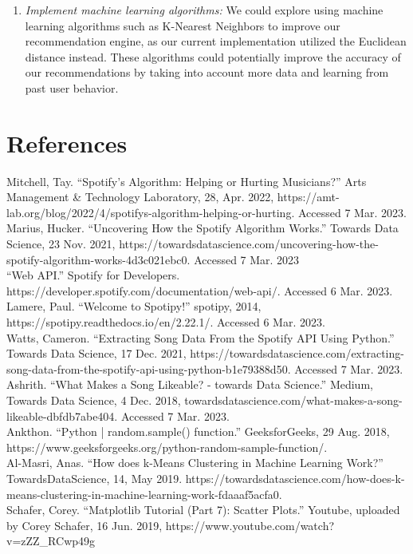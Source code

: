 \documentclass[fontsize=11pt]{article}
\begin{document}
\begin{enumerate}
\begin{enumerate}
\begin{enumerate}
        \item \emph{Implement machine learning algorithms:} We could explore using machine learning algorithms such as K-Nearest Neighbors to improve our recommendation engine, as our current implementation utilized the Euclidean distance instead. These algorithms could potentially improve the accuracy of our recommendations by taking into account more data and learning from past user behavior.\\
    \end{enumerate}


     
    \end{enumerate}
\end{enumerate}

\section{References}
Mitchell, Tay. “Spotify’s Algorithm: Helping or Hurting Musicians?” Arts Management \& Technology Laboratory, 28, Apr. 2022, https://amt-lab.org/blog/2022/4/spotifys-algorithm-helping-or-hurting. Accessed 7 Mar. 2023.\\ 

Marius, Hucker. “Uncovering How the Spotify Algorithm Works.” Towards Data Science, 23 Nov. 2021, https://towardsdatascience.com/uncovering-how-the-spotify-algorithm-works-4d3c021ebc0. Accessed 7 Mar. 2023 \\

“Web API.”  Spotify for Developers. https://developer.spotify.com/documentation/web-api/. Accessed 6 Mar. 2023. \\

Lamere, Paul. “Welcome to Spotipy!” spotipy, 2014, https://spotipy.readthedocs.io/en/2.22.1/. Accessed 6 Mar. 2023. \\

Watts, Cameron. “Extracting Song Data From the Spotify API Using Python.” Towards Data Science, 17 Dec. 2021, https://towardsdatascience.com/extracting-song-data-from-the-spotify-api-using-python-b1e79388d50. Accessed 7 Mar. 2023. \\

Ashrith. “What Makes a Song Likeable? - towards Data Science.” Medium, Towards Data Science, 4 Dec. 2018, towardsdatascience.com/what-makes-a-song-likeable-dbfdb7abe404. Accessed 7 Mar. 2023. \\

Ankthon. “Python | random.sample() function.” GeeksforGeeks, 29 Aug. 2018, https://www.geeksforgeeks.org/python-random-sample-function/.  \\

Al-Masri, Anas. “How does k-Means Clustering in Machine Learning Work?” TowardsDataScience, 14, May 2019. https://towardsdatascience.com/how-does-k-means-clustering-in-machine-learning-work-fdaaaf5acfa0. \\

Schafer, Corey. “Matplotlib Tutorial (Part 7): Scatter Plots.” Youtube, uploaded by Corey Schafer, 16 Jun. 2019, https://www.youtube.com/watch?v=zZZ\_RCwp49g \\
\end{document}
